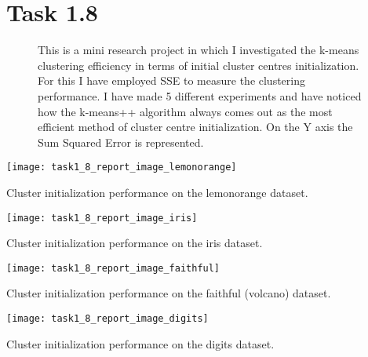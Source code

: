 \documentclass[12pt]{extarticle}
\begin{document}
\section{Task 1.8}
\begin{figure}[h!]
\caption{This is a mini research project in which I investigated the k-means clustering efficiency in terms of initial cluster centres initialization. For this I have employed SSE to measure the clustering performance. I have made 5 different experiments and have noticed how the k-means++ algorithm always comes out as the most efficient method of cluster centre initialization. On the Y axis the Sum Squared Error is represented.}
\end{figure}
{\centering
\texttt{[image: task1\_8\_report\_image\_lemonorange]}
\begin{center}
Cluster initialization performance on the lemonorange dataset.
\end{center}
\texttt{[image: task1\_8\_report\_image\_iris]}
\begin{center}
Cluster initialization performance on the iris dataset.
\end{center}
\texttt{[image: task1\_8\_report\_image\_faithful]}
\begin{center}
Cluster initialization performance on the faithful (volcano) dataset.
\end{center}
\texttt{[image: task1\_8\_report\_image\_digits]}
\begin{center}
Cluster initialization performance on the digits dataset.
\end{center}
}
\end{document}
